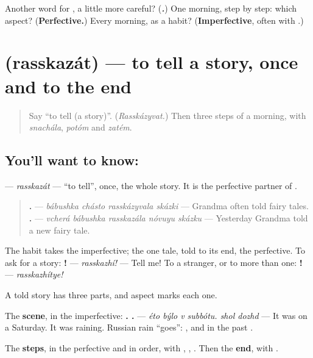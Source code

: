 \begin{tcolorbox}[breakable,colback=teal!4,colframe=teal!35!black,title={Before you move on}]
Another word for \emph{}, a little more careful? (\emph{\textbf{.}}) One morning, step by step: which aspect? (\textbf{Perfective.}) Every morning, as a habit? (\textbf{Imperfective}, often with \emph{\textbf{}}.)
\end{tcolorbox}
\section[\texorpdfstring{\ru{рассказать} (rasskazát)}{рассказать (rasskazát)}]{ (rasskazát) — to tell a story, once and to the end}

\label{lesson:RU-C262-rasskazat}



\begin{quote}
Say \textquotedblleft{}to tell (a story)\textquotedblright{}. (\emph{Rasskázyvat.}) Then three steps of a morning, with \emph{snachála}, \emph{potóm} and \emph{zatém}.
\end{quote}

\subsection*{You'll want to know: }
\textbf{} — \emph{rasskazát} — \textquotedblleft{}to tell\textquotedblright{}, once, the whole story. It is the perfective partner of \textbf{}.

\begin{quote}
\textbf{   .} — \emph{bábushka chásto rasskázyvala skázki} — Grandma often told fairy tales. \textbf{    .} — \emph{vcherá bábushka rasskazála nóvuyu skázku} — Yesterday Grandma told a new fairy tale.
\end{quote}

The habit takes the imperfective; the one tale, told to its end, the perfective. To ask for a story: \textbf{!} — \emph{rasskazhí!} — Tell me! To a stranger, or to more than one: \textbf{!} — \emph{rasskazhítye!}

\begin{grammarlens}[title={Grammar Lens: scene, steps, end}]
A told story has three parts, and aspect marks each one.

The \textbf{scene}, in the imperfective: \textbf{   .  .} — \emph{éto býlo v subbótu. shol dozhd} — It was on a Saturday. It was raining. Russian rain \textquotedblleft{}goes\textquotedblright{}: \emph{ }, and in the past \emph{ }.

The \textbf{steps}, in the perfective and in order, with \emph{}, \emph{}, \emph{}. Then the \textbf{end}, with \textbf{}.
\end{grammarlens}

